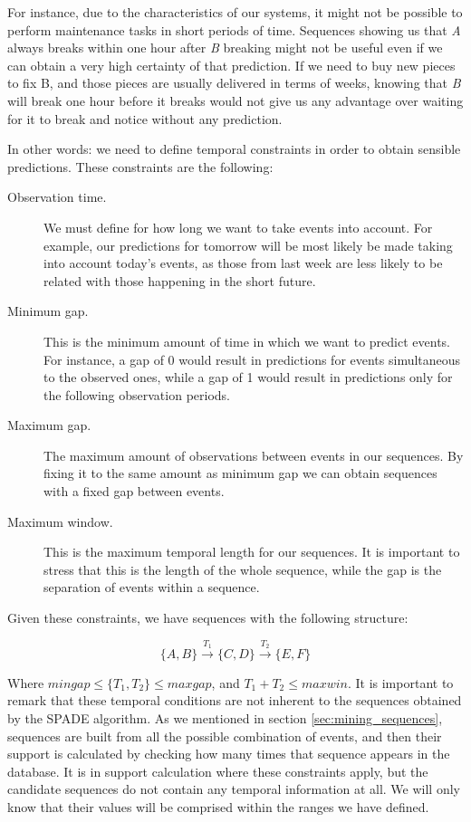 For instance, due to the characteristics of our systems, it might not be possible to perform maintenance tasks in short periods of time. Sequences showing us that \emph{A} always breaks within one hour after \emph{B} breaking might not be useful even if we can obtain a very high certainty of that prediction. If we need to buy new pieces to fix B, and those pieces are usually delivered in terms of weeks, knowing that \emph{B} will break one hour before it breaks would not give us any advantage over waiting for it to break and notice without any prediction.

In other words: we need to define temporal constraints in order to obtain sensible predictions\cite{zaki2000cspade}. These constraints are the following:

\begin{description}
\item[Observation time.] We must define for how long we want to take events into account. For example, our predictions for tomorrow will be most likely be made taking into account today's events, as those from last week are less likely to be related with those happening in the short future.
\item[Minimum gap.] This is the minimum amount of time in which we want to predict events. For instance, a gap of 0 would result in predictions for events simultaneous to the observed ones, while a gap of 1 would result in predictions only for the following observation periods.
\item[Maximum gap.] The maximum amount of observations between events in our sequences. By fixing it to the same amount as minimum gap we can obtain sequences with a fixed gap between events.
\item[Maximum window.] This is the maximum temporal length for our sequences. It is important to stress that this is the length of the whole sequence, while the gap is the separation of events within a sequence.
\end{description}

Given these constraints, we have sequences with the following structure:

$$\{A, B\} \xrightarrow{T_1} \{C, D\} \xrightarrow{T_2} \{E, F\}$$

Where $mingap \leq \{T_1, T_2\} \leq maxgap$, and $T_1+T_2 \leq maxwin$. It is important to remark that these temporal conditions are not inherent to the sequences obtained by the SPADE algorithm. As we mentioned in section \ref{sec:mining_sequences}, sequences are built from all the possible combination of events, and then their support is calculated by checking how many times that sequence appears in the database. It is in support calculation where these constraints apply, but the candidate sequences do not contain any temporal information at all. We will only know that their values will be comprised within the ranges we have defined.

